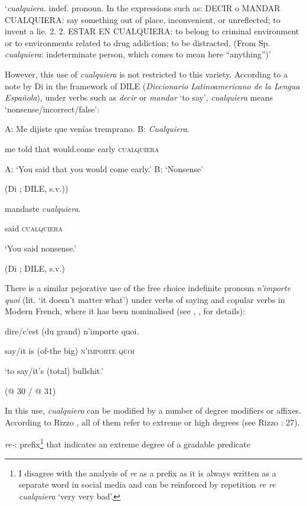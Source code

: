 \documentclass[output=paper]{langscibook}
\begin{document}
‘\textit{cualquiera.} indef. pronoun. In the expressions such as: DECIR o MANDAR CUALQUIERA: say something out of place, inconvenient, or unreflected; to invent a lie. {\textbar} 2. 2. ESTAR EN CUALQUIERA: to belong to criminal environment or to environments related to drug addiction; to be distracted. (From Sp. \textit{cualquiera}: indeterminate person, which comes to mean here “anything”)’

However, this use of \textit{cualquiera} is not restricted to this variety. According to a note by Di \citet{Tullio2015} in the framework of DILE (\textit{Diccionario Latinoamericano de la Lengua Española}), under verbs such as \textit{decir} or \textit{mandar} ‘to say’, \textit{cualquiera} means ‘nonsense/incorrect/false’:

  A:   Me  dijiste  que  venías tremprano.  B:   \textit{Cualquiera}.

    me  told  that  would.come  early     \textsc{cualquiera}

  A: ‘You said that you would come early.’ B: ‘Nonsense’

    (Di \citealt{Tullio2015}; DILE, s.v.))

  mandaste  \textit{cualquiera}.  

  said  \textsc{cualquiera}  

  ‘You said nonsense.’

(Di \citealt{Tullio2015}; DILE, s.v.)

There is a similar pejorative use of the free choice indefinite pronoun \textit{n’importe quoi} (lit. ‘it doesn’t matter what’) under verbs of saying and copular verbs in Modern French, where it has been nominalised (see \citealt{Paillard1997}, \citealt{Pescarini2009},  for details):

  dire/c’est   (du grand)  n’importe quoi.

  say/it is  (of-the big)  \textsc{n’importe} \textsc{quoi}

  ‘to say/it’s (total) bullshit.’

  (@ 30 / @ 31)

In this use, \textit{cualquiera} can be modified by a number of degree modifiers or affixes. According to Rizzo \citet{Salierno2013}, all of them refer to extreme or high degrees (see Rizzo \citealt{Salierno2013}: 27).

  \textit{re-}: prefix\footnote{\textrm{I disagree with the analysis of} \textrm{\textit{re}} \textrm{as a prefix as it is always written as a separate word in social media and can be reinforced by repetition} \textrm{\textit{re re cualquiera}} \textrm{‘very very bad’.}}  that indicates an extreme degree of a gradable predicate 
\end{document}
